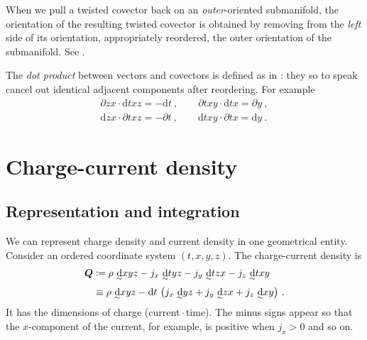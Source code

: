 \documentclass[\ifafour a4paper,12pt,\else a5paper,10pt,\fi%
onecolumn,oneside,article,%
british%
]{memoir}
\theoremstyle{remark}
\theoremstyle{innote}
\newcommand*{\de}{\partialup}%
\newcommand*{\di}{\mathrm{d}}%
\newcommand*{\defd}{\coloneqq}
\renewcommand*{\|}[1][]{\nonscript\:#1\vert\nonscript\:\mathopen{}}
\newcommand*{\sect}{\S}%
\newcommand*{\tw}[2][\scriptstyle\sim]{\smash[b]{\underset{\mathclap{{}^{#1}}}{#2}}}
\newcommand*{\ti}[1][\scriptstyle\sim]{\tw[#1]{\di}}
\begin{document}
When we pull a twisted covector back on an \emph{outer}-oriented submanifold, the orientation of the resulting twisted covector is obtained by removing from the \emph{left} side of its orientation, appropriately reordered, the outer orientation of the submanifold. See \cites[p.~192]{burke1985_r1987}.

The \emph{dot product} between vectors and covectors is defined as in  \cites[\sect~267 p.~661]{truesdelletal1960}: they so to speak cancel out identical adjacent components after reordering. For example
\begin{equation}
  \label{eq:example_dot_product}
  \begin{gathered}
  \de zx \cdot \di txz = -\di t \ ,\qquad
  \de txy \cdot \di tx = \de y \ ,\\
  \di zx \cdot \de txz = -\de t \ ,\qquad
  \di txy \cdot \de tx = \di y \ .
\end{gathered}
\end{equation}



\section{Charge-current density}
\label{sec:charge_current}

\subsection{Representation and integration}
\label{sec:charge_repr}

We can represent charge density and current density in one geometrical entity. Consider an ordered coordinate system $(t, x, y, z)$. The charge-current density is
\begin{equation}
  \label{eq:charge-current}
  \begin{split}
\bm{Q} &\defd  \rho\ \ti xyz
- j_{x}\ \ti tyz - j_{y}\ \ti tzx - j_{z}\ \ti txy
  \\[\jot]
  &\equiv\rho\ \ti xyz -
  \di t\ \bigl(j_{x}\ \ti yz + j_{y}\ \ti zx + j_{z}\ \ti xy\bigr) \ .
\end{split}
\end{equation}
It has the dimensions of charge (current${}\cdot{}$time). The minus signs appear so that the $x$-component of the current, for example, is positive when $j_{x} > 0$ and so on.
\end{document}
